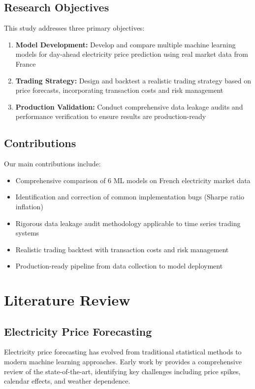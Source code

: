\documentclass[11pt,a4paper]{article}
\begin{document}
\subsection{Research Objectives}

This study addresses three primary objectives:

\begin{enumerate}
    \item \textbf{Model Development:} Develop and compare multiple machine learning models for day-ahead electricity price prediction using real market data from France
    \item \textbf{Trading Strategy:} Design and backtest a realistic trading strategy based on price forecasts, incorporating transaction costs and risk management
    \item \textbf{Production Validation:} Conduct comprehensive data leakage audits and performance verification to ensure results are production-ready
\end{enumerate}

\subsection{Contributions}

Our main contributions include:
\begin{itemize}
    \item Comprehensive comparison of 6 ML models on French electricity market data
    \item Identification and correction of common implementation bugs (Sharpe ratio inflation)
    \item Rigorous data leakage audit methodology applicable to time series trading systems
    \item Realistic trading backtest with transaction costs and risk management
    \item Production-ready pipeline from data collection to model deployment
\end{itemize}

\section{Literature Review}

\subsection{Electricity Price Forecasting}

Electricity price forecasting has evolved from traditional statistical methods to modern machine learning approaches. Early work by \cite{weron2014} provides a comprehensive review of the state-of-the-art, identifying key challenges including price spikes, calendar effects, and weather dependence.
\end{document}
